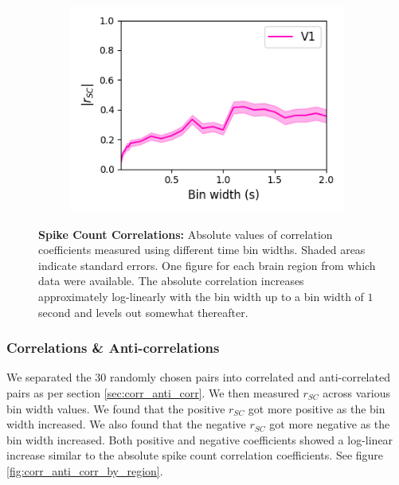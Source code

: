 \documentclass[a4paper,12pt]{article}
\theoremstyle{definition}
\begin{document}
\begin{figure}[p]
\begin{subfigure}{0.5\textwidth}
    \includegraphics[width=\textwidth]{figures/linear_bin_width_correlations_v1_6.png}
  \end{subfigure}
  \caption{\textbf{Spike Count Correlations:} Absolute values of correlation coefficients measured using different time bin widths. Shaded areas indicate standard errors. One figure for each brain region from which data were available. The absolute correlation increases approximately log-linearly with the bin width up to a bin width of $1$ second and levels out somewhat thereafter.}
  \label{fig:linear_bin_width_vs_correlation_by_region}
\end{figure}

\subsubsection{Correlations \& Anti-correlations}
We separated the $30$ randomly chosen pairs into correlated and anti-correlated pairs as per section \ref{sec:corr_anti_corr}. We then measured $r_{SC}$ across various bin width values. We found that the positive $r_{SC}$ got more positive as the bin width increased. We also found that the negative $r_{SC}$ got more negative as the bin width increased. Both positive and negative coefficients showed a log-linear increase similar to the absolute spike count correlation coefficients. See figure \ref{fig:corr_anti_corr_by_region}.
\end{document}
